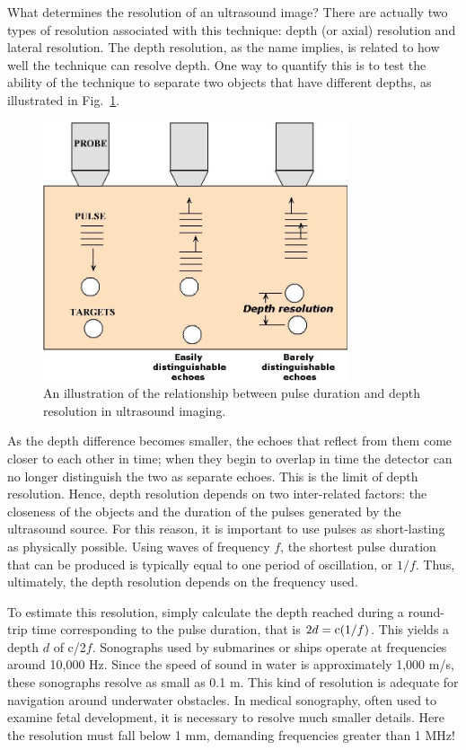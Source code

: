 What determines the resolution of an ultrasound image?  There are actually two types of resolution associated with this technique: depth (or axial) resolution and lateral resolution. The depth resolution, as the name implies, is related to how well the technique can resolve depth. One way to quantify this is to test the ability of the technique to separate two objects that have different depths, as illustrated in Fig.~\ref{Fig10-5}. 
\begin{figure}[!htb]
	\centering
	\includegraphics[height=3.0in]{./figures/Topic10/Fig10-5.jpg}
	\caption{An illustration of the relationship between pulse duration and depth resolution in ultrasound imaging.}
	\label{Fig10-5}
\end{figure}
As the depth difference becomes smaller, the echoes that reflect from them come closer to each other in time; when they begin to overlap in time the detector can no longer distinguish the two as separate echoes. This is the limit of depth resolution. Hence, depth resolution depends on two inter-related factors: the closeness of the objects and the duration of the pulses generated by the ultrasound source.  For this reason, it is important to use pulses as short-lasting as physically possible. Using waves of frequency $f$, the shortest pulse duration that can be produced is typically equal to one period of oscillation, or $1/f$.   Thus, ultimately, the depth resolution depends on the frequency used.

To estimate this resolution, simply calculate the depth reached during a round-trip time corresponding to the pulse duration, that is $2d={\rm  c} (1/f)$. This yields a depth $d$ of c/2$f$. Sonographs used by submarines or ships operate at frequencies around 10,000 Hz.  Since the speed of sound in water is approximately 1,000 m/s, these sonographs resolve as small as 0.1 m.  This kind of resolution is adequate for navigation around underwater obstacles. In medical sonography, often used to examine fetal development, it is necessary to resolve much smaller details.  Here the resolution must fall below 1 mm, demanding frequencies greater than 1 MHz!
  
